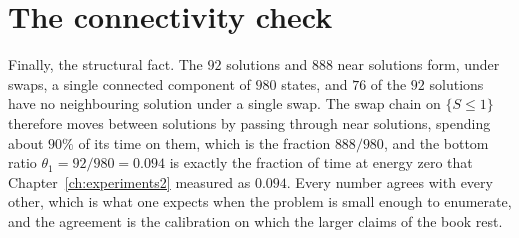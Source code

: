 \section{The connectivity check}

Finally, the structural fact. The $92$ solutions and $888$ near solutions form, under swaps, a single connected component of $980$ states, and $76$ of the $92$ solutions have no neighbouring solution under a single swap. The swap chain on $\{ S \le 1 \}$ therefore moves between solutions by passing through near solutions, spending about $90\%$ of its time on them, which is the fraction $888/980$, and the bottom ratio $\theta_1 = 92/980 = 0.094$ is exactly the fraction of time at energy zero that Chapter~\ref{ch:experiments2} measured as $0.094$. Every number agrees with every other, which is what one expects when the problem is small enough to enumerate, and the agreement is the calibration on which the larger claims of the book rest.
